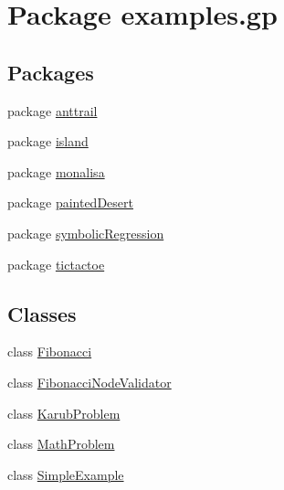 \hypertarget{namespaceexamples_1_1gp}{\section{Package examples.\-gp}
\label{namespaceexamples_1_1gp}
}
\subsection*{Packages}
\begin{DoxyCompactItemize}
\item 
package \hyperlink{namespaceexamples_1_1gp_1_1anttrail}{anttrail}
\item 
package \hyperlink{namespaceexamples_1_1gp_1_1island}{island}
\item 
package \hyperlink{namespaceexamples_1_1gp_1_1monalisa}{monalisa}
\item 
package \hyperlink{namespaceexamples_1_1gp_1_1painted_desert}{painted\-Desert}
\item 
package \hyperlink{namespaceexamples_1_1gp_1_1symbolic_regression}{symbolic\-Regression}
\item 
package \hyperlink{namespaceexamples_1_1gp_1_1tictactoe}{tictactoe}
\end{DoxyCompactItemize}
\subsection*{Classes}
\begin{DoxyCompactItemize}
\item 
class \hyperlink{classexamples_1_1gp_1_1_fibonacci}{Fibonacci}
\item 
class \hyperlink{classexamples_1_1gp_1_1_fibonacci_node_validator}{Fibonacci\-Node\-Validator}
\item 
class \hyperlink{classexamples_1_1gp_1_1_karub_problem}{Karub\-Problem}
\item 
class \hyperlink{classexamples_1_1gp_1_1_math_problem}{Math\-Problem}
\item 
class \hyperlink{classexamples_1_1gp_1_1_simple_example}{Simple\-Example}
\end{DoxyCompactItemize}
